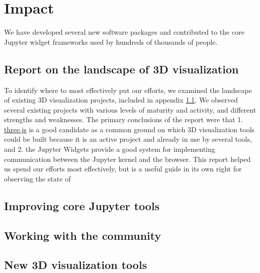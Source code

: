 \documentclass{deliverablereport}
\begin{document}

\section{Impact}

We have developed several new software packages and contributed to the core Jupyter widget frameworks used by hundreds of thousands of people.

\subsection{Report on the landscape of 3D visualization}\label{landscape}

To identify where to most effectively put our efforts,
we examined the landscape of existing 3D visualization projects,
included in appendix \ref{landscape}.
We observed several existing projects with various levels of maturity and activity, and different strengths and weaknesses.
The primary conclusions of the report were that 1. \href{https://threejs.org}{three.js} is a good candidate as a common ground on which 3D visualization tools could be built because it is an active project and already in use by several tools, and 2. the Jupyter Widgets provide a good system for implementing communication between the Jupyter kernel and the browser.
This report helped us spend our efforts most effectively,
but is a useful guide in its own right for observing the state of


\subsection{Improving core Jupyter tools}\label{improving-core}


\subsection{Working with the community}\label{community}


\subsection{New 3D visualization tools}\label{new-3d}

\end{document}
